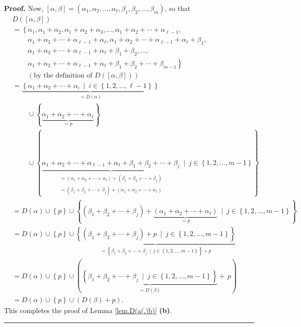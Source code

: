 \documentclass
[numbers=enddot,12pt,final,onecolumn,notitlepage,abstracton]{scrartcl}%
\theoremstyle{definition}
\newenvironment{proof}[1][Proof]{\noindent\textbf{#1.} }{\ \rule{0.5em}{0.5em}}
\newenvironment{verlong}{}{}
\begin{document}
\begin{verlong}
\begin{proof}
Now, $\left[  \alpha,\beta\right]  =\left(  \alpha_{1},\alpha_{2}%
,\ldots,\alpha_{\ell},\beta_{1},\beta_{2},\ldots,\beta_{m}\right)  $, so that%
\begin{align*}
&  D\left(  \left[  \alpha,\beta\right]  \right) \\
&  =\left\{  \alpha_{1},\alpha_{1}+\alpha_{2},\alpha_{1}+\alpha_{2}+\alpha
_{3},\ldots,\alpha_{1}+\alpha_{2}+\cdots+\alpha_{\ell-1},\right. \\
&  \ \ \ \ \ \ \ \ \ \ \left.  \alpha_{1}+\alpha_{2}+\cdots+\alpha_{\ell
-1}+\alpha_{\ell},\alpha_{1}+\alpha_{2}+\cdots+\alpha_{\ell-1}+\alpha_{\ell
}+\beta_{1},\right. \\
&  \ \ \ \ \ \ \ \ \ \ \left.  \alpha_{1}+\alpha_{2}+\cdots+\alpha_{\ell
-1}+\alpha_{\ell}+\beta_{1}+\beta_{2},\ldots,\right. \\
&  \ \ \ \ \ \ \ \ \ \ \left.  \alpha_{1}+\alpha_{2}+\cdots+\alpha_{\ell
-1}+\alpha_{\ell}+\beta_{1}+\beta_{2}+\cdots+\beta_{m-1}\right\} \\
&  \ \ \ \ \ \ \ \ \ \ \left(  \text{by the definition of }D\left(  \left[
\alpha,\beta\right]  \right)  \right) \\
&  =\underbrace{\left\{  \alpha_{1}+\alpha_{2}+\cdots+\alpha_{i}\ \mid
\ i\in\left\{  1,2,\ldots,\ell-1\right\}  \right\}  }_{=D\left(
\alpha\right)  }\\
&  \ \ \ \ \ \ \ \ \ \ \cup\left\{  \underbrace{\alpha_{1}+\alpha_{2}%
+\cdots+\alpha_{\ell}}_{=p}\right\} \\
&  \ \ \ \ \ \ \ \ \ \ \cup\left\{  \underbrace{\alpha_{1}+\alpha_{2}%
+\cdots+\alpha_{\ell-1}+\alpha_{\ell}+\beta_{1}+\beta_{2}+\cdots+\beta_{j}%
}_{\substack{=\left(  \alpha_{1}+\alpha_{2}+\cdots+\alpha_{\ell}\right)
+\left(  \beta_{1}+\beta_{2}+\cdots+\beta_{j}\right)  \\=\left(  \beta
_{1}+\beta_{2}+\cdots+\beta_{j}\right)  +\left(  \alpha_{1}+\alpha_{2}%
+\cdots+\alpha_{\ell}\right)  }}\ \mid\ j\in\left\{  1,2,\ldots,m-1\right\}
\right\} \\
&  =D\left(  \alpha\right)  \cup\left\{  p\right\}  \cup\left\{  \left(
\beta_{1}+\beta_{2}+\cdots+\beta_{j}\right)  +\underbrace{\left(  \alpha
_{1}+\alpha_{2}+\cdots+\alpha_{\ell}\right)  }_{=p}\ \mid\ j\in\left\{
1,2,\ldots,m-1\right\}  \right\} \\
&  =D\left(  \alpha\right)  \cup\left\{  p\right\}  \cup\underbrace{\left\{
\left(  \beta_{1}+\beta_{2}+\cdots+\beta_{j}\right)  +p\ \mid\ j\in\left\{
1,2,\ldots,m-1\right\}  \right\}  }_{=\left\{  \beta_{1}+\beta_{2}%
+\cdots+\beta_{j}\ \mid\ j\in\left\{  1,2,\ldots,m-1\right\}  \right\}  +p}\\
&  =D\left(  \alpha\right)  \cup\left\{  p\right\}  \cup\left(
\underbrace{\left\{  \beta_{1}+\beta_{2}+\cdots+\beta_{j}\ \mid\ j\in\left\{
1,2,\ldots,m-1\right\}  \right\}  }_{=D\left(  \beta\right)  }+\,p\right) \\
&  =D\left(  \alpha\right)  \cup\left\{  p\right\}  \cup\left(  D\left(
\beta\right)  +p\right)  .
\end{align*}
This completes the proof of Lemma \ref{lem.D(a(.)b)} \textbf{(b)}.
\end{proof}
\end{verlong}
\end{document}
